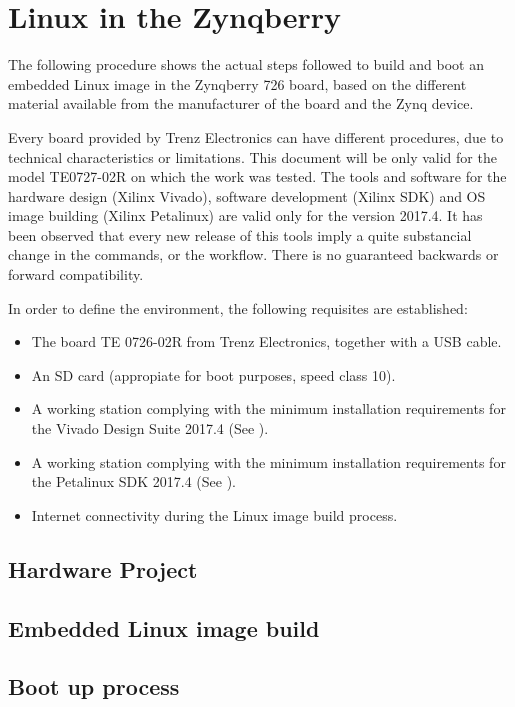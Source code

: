 
\chapter{Linux in the Zynqberry} \label{appen1}

The following procedure shows the actual steps followed to build and boot an embedded Linux image in the Zynqberry 726 board, based on the different material available from the manufacturer of the board and the Zynq device.

Every board provided by Trenz Electronics can have different procedures, due to technical characteristics or limitations. This document will be only valid for the model TE0727-02R on which the work was tested. The tools and software for the hardware design (Xilinx Vivado), software development (Xilinx SDK) and OS image building (Xilinx Petalinux) are valid only for the version 2017.4. It has been observed that every new release of this tools imply a quite substancial change in the commands, or the workflow. There is no guaranteed backwards or forward compatibility.

In order to define the environment, the following requisites are established:

\begin{itemize}
	\item The board TE 0726-02R from Trenz Electronics, together with a USB cable.
	\item An SD card (appropiate for boot purposes, speed class 10).
	\item A working station complying with the minimum installation requirements for the Vivado Design Suite 2017.4 (See \cite{UG973}).
	\item A working station complying with the minimum installation requirements for the Petalinux SDK 2017.4 (See \cite{UG1144}).
	\item Internet connectivity during the Linux image build process.
\end{itemize}


\section{Hardware Project}

\section{Embedded Linux image build}

\section{Boot up process}
